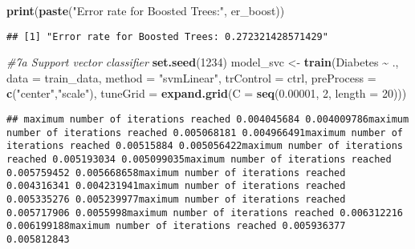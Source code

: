 \documentclass[
]{article}
\newenvironment{Shaded}{\begin{snugshade}}{\end{snugshade}}
\newcommand{\AttributeTok}[1]{\textcolor[rgb]{0.13,0.29,0.53}{#1}}
\newcommand{\CommentTok}[1]{\textcolor[rgb]{0.56,0.35,0.01}{\textit{#1}}}
\newcommand{\DecValTok}[1]{\textcolor[rgb]{0.00,0.00,0.81}{#1}}
\newcommand{\FloatTok}[1]{\textcolor[rgb]{0.00,0.00,0.81}{#1}}
\newcommand{\FunctionTok}[1]{\textcolor[rgb]{0.13,0.29,0.53}{\textbf{#1}}}
\newcommand{\NormalTok}[1]{#1}
\newcommand{\OtherTok}[1]{\textcolor[rgb]{0.56,0.35,0.01}{#1}}
\newcommand{\SpecialCharTok}[1]{\textcolor[rgb]{0.81,0.36,0.00}{\textbf{#1}}}
\newcommand{\StringTok}[1]{\textcolor[rgb]{0.31,0.60,0.02}{#1}}
\begin{document}
\begin{Shaded}
\begin{Highlighting}[]
\FunctionTok{print}\NormalTok{(}\FunctionTok{paste}\NormalTok{(}\StringTok{"Error rate for Boosted Trees:"}\NormalTok{, er\_boost))}
\end{Highlighting}
\end{Shaded}

\begin{verbatim}
## [1] "Error rate for Boosted Trees: 0.272321428571429"
\end{verbatim}

\begin{Shaded}
\begin{Highlighting}[]
\CommentTok{\#7a Support vector classifier}
\FunctionTok{set.seed}\NormalTok{(}\DecValTok{1234}\NormalTok{)}
\NormalTok{model\_svc }\OtherTok{\textless{}{-}} \FunctionTok{train}\NormalTok{(Diabetes }\SpecialCharTok{\textasciitilde{}}\NormalTok{ ., }
                   \AttributeTok{data =}\NormalTok{ train\_data, }
                   \AttributeTok{method =} \StringTok{"svmLinear"}\NormalTok{,}
                   \AttributeTok{trControl =}\NormalTok{ ctrl,}
                   \AttributeTok{preProcess =} \FunctionTok{c}\NormalTok{(}\StringTok{"center"}\NormalTok{,}\StringTok{"scale"}\NormalTok{),}
                   \AttributeTok{tuneGrid =} \FunctionTok{expand.grid}\NormalTok{(}\AttributeTok{C =} \FunctionTok{seq}\NormalTok{(}\FloatTok{0.00001}\NormalTok{, }\DecValTok{2}\NormalTok{, }\AttributeTok{length =} \DecValTok{20}\NormalTok{)))}
\end{Highlighting}
\end{Shaded}

\begin{verbatim}
## maximum number of iterations reached 0.004045684 0.004009786maximum number of iterations reached 0.005068181 0.004966491maximum number of iterations reached 0.00515884 0.005056422maximum number of iterations reached 0.005193034 0.005099035maximum number of iterations reached 0.005759452 0.005668658maximum number of iterations reached 0.004316341 0.004231941maximum number of iterations reached 0.005335276 0.005239977maximum number of iterations reached 0.005717906 0.0055998maximum number of iterations reached 0.006312216 0.006199188maximum number of iterations reached 0.005936377 0.005812843
\end{verbatim}

\begin{Shaded}
\end{Shaded}
\end{document}
